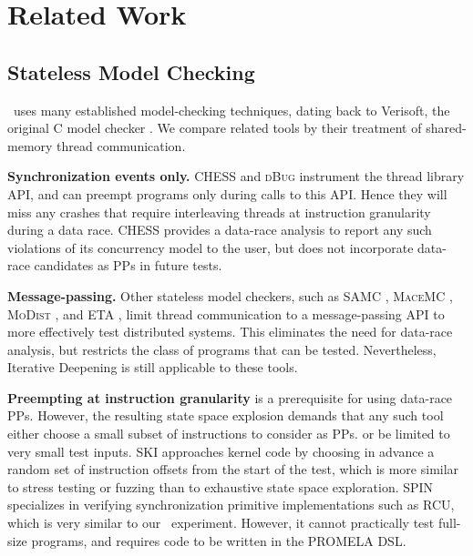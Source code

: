 \section{Related Work}


\subsection{Stateless Model Checking}

\landslide~uses many established model-checking techniques, dating back
to Verisoft, the original C model checker \cite{verisoft}.
We compare related tools by their treatment of shared-memory thread communication.

{\bf Synchronization events only.} CHESS \cite{chess} and \textsc{dBug} \cite{dbug-ssv} instrument the thread library API, and can preempt programs only during calls to this API.
Hence they will miss any crashes that require interleaving threads at instruction granularity during a data race. CHESS provides a data-race analysis to report any such violations of its concurrency model to the user, but does not incorporate data-race candidates as PPs in future tests.

{\bf Message-passing.} Other stateless model checkers, such as SAMC \cite{samc}, \textsc{MaceMC} \cite{macemc}, \textsc{MoDist} \cite{modist}, and ETA \cite{dbug-retreat}, limit thread communication to a message-passing API to more effectively test distributed systems.
This eliminates the need for data-race analysis, but restricts the class of programs that can be tested.
Nevertheless, Iterative Deepening is still applicable to these tools.

{\bf Preempting at instruction granularity} is a prerequisite for using data-race PPs.
However, the resulting state space explosion demands that any such tool either
choose a small subset of instructions to consider as PPs.
or be limited to very small test inputs.
{\textsc SKI} \cite{ski} approaches kernel code by choosing in advance a random set of instruction offsets from the start of the test,
which is more similar to stress testing or fuzzing than to exhaustive state space exploration.
SPIN \cite{spin} specializes in verifying synchronization primitive implementations such as RCU, which is very similar to our \mxtest~experiment.
However, it cannot practically test full-size programs, and requires code to be written in the PROMELA DSL.

